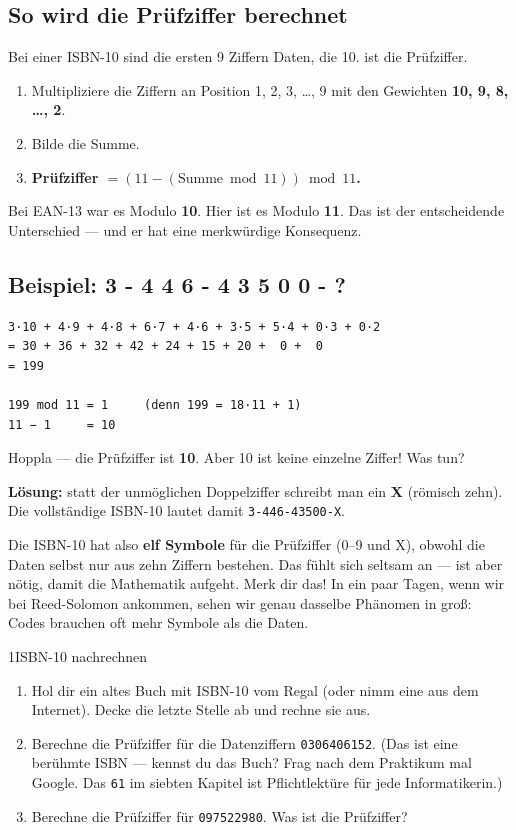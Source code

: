 \subsection*{So wird die Prüfziffer berechnet}

Bei einer ISBN-10 sind die ersten 9 Ziffern Daten, die 10. ist die
Prüfziffer.

\begin{enumerate}
\item Multipliziere die Ziffern an Position 1, 2, 3, \dots, 9 mit den
  Gewichten \textbf{10, 9, 8, \dots, 2}.
\item Bilde die Summe.
\item \textbf{Prüfziffer $= (11 - (\text{Summe} \bmod 11)) \bmod 11$.}
\end{enumerate}

Bei EAN-13 war es Modulo \textbf{10}. Hier ist es Modulo \textbf{11}.
Das ist der entscheidende Unterschied — und er hat eine merkwürdige
Konsequenz.

\subsection*{Beispiel: 3 - 4 4 6 - 4 3 5 0 0 - ?}

\begin{verbatim}
3·10 + 4·9 + 4·8 + 6·7 + 4·6 + 3·5 + 5·4 + 0·3 + 0·2
= 30 + 36 + 32 + 42 + 24 + 15 + 20 +  0 +  0
= 199

199 mod 11 = 1     (denn 199 = 18·11 + 1)
11 − 1     = 10
\end{verbatim}

Hoppla — die Prüfziffer ist \textbf{10}. Aber 10 ist keine einzelne
Ziffer! Was tun?

\textbf{Lösung:} statt der unmöglichen Doppelziffer schreibt man ein
\textbf{X} (römisch zehn). Die vollständige ISBN-10 lautet damit
\texttt{3-446-43500-X}.

Die ISBN-10 hat also \textbf{elf Symbole} für die Prüfziffer (0–9
und X), obwohl die Daten selbst nur aus zehn Ziffern bestehen. Das fühlt sich seltsam an — ist aber nötig, damit die
Mathematik aufgeht. Merk dir das! In ein paar Tagen, wenn wir bei
Reed-Solomon ankommen, sehen wir genau dasselbe Phänomen in groß: Codes
brauchen oft mehr Symbole als die Daten.

\begin{bleistiftuebung}{1}{ISBN-10 nachrechnen}
\begin{enumerate}[label=(\alph*), leftmargin=*]
\item Hol dir ein altes Buch mit ISBN-10 vom Regal (oder nimm eine aus
  dem Internet). Decke die letzte Stelle ab und rechne sie aus.
\item Berechne die Prüfziffer für die Datenziffern \texttt{0306406152}.
  (Das ist eine berühmte ISBN — kennst du das Buch? Frag nach dem
  Praktikum mal Google. Das \texttt{61} im siebten Kapitel ist
  Pflichtlektüre für jede Informatikerin.)
\item Berechne die Prüfziffer für \texttt{097522980}. Was ist die
  Prüfziffer?
\end{enumerate}
\end{bleistiftuebung}

